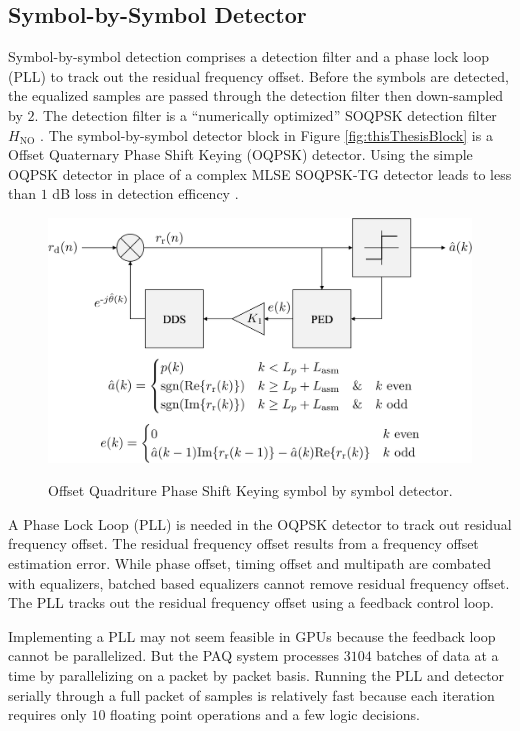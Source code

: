 \subsection{Symbol-by-Symbol Detector}
\label{sec:oqpsk_detector}
Symbol-by-symbol detection comprises a detection filter and a phase lock loop (PLL) to track out the residual frequency offset.
Before the symbols are detected, the equalized samples are passed through the detection filter then down-sampled by $2$. 
The detection filter is a ``numerically optimized'' SOQPSK detection filter $H_\text{NO}$ \cite[Fig. 3]{perrins:2013}.
The symbol-by-symbol detector block in Figure \ref{fig:thisThesisBlock} is a Offset Quaternary Phase Shift Keying (OQPSK) detector.
Using the simple OQPSK detector in place of a complex MLSE SOQPSK-TG detector leads to less than $1$ dB loss in detection efficency \cite{perrins:2013}.
\begin{figure}
	\centering\includegraphics[width=9.11in/100*55]{figures/systemOverview/OQPSK.pdf}
	\label{fig:OQPSK}
	\caption{Offset Quadriture Phase Shift Keying symbol by symbol detector.}
\end{figure}

A Phase Lock Loop (PLL) is needed in the OQPSK detector to track out residual frequency offset.
The residual frequency offset results from a frequency offset estimation error.
While phase offset, timing offset and multipath are combated with equalizers, batched based equalizers cannot remove residual frequency offset.
The PLL tracks out the residual frequency offset using a feedback control loop.

Implementing a PLL may not seem feasible in GPUs because the feedback loop cannot be parallelized.
But the PAQ system processes $3104$ batches of data at a time by parallelizing on a packet by packet basis.
Running the PLL and detector serially through a full packet of samples is relatively fast because each iteration requires only $10$ floating point operations and a few logic decisions.


